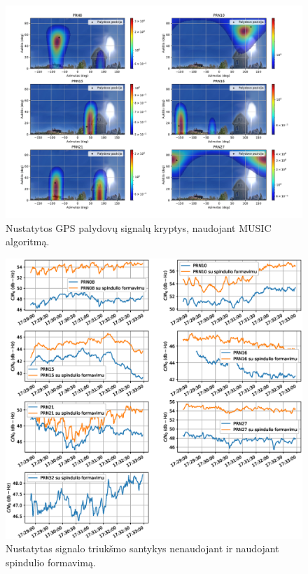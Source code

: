\documentclass[main.tex]{subfiles}
\begin{document}
\begin{figure}[ht]
    \begin{centering}
    \includegraphics[scale=0.45]{drawings/one_reflection_2}
    \par\end{centering}
    \protect\caption{\label{fig:single_reflection}Nustatytos GPS palydovų signalų kryptys, naudojant MUSIC algoritmą.}
\end{figure}

\begin{figure}[ht]
    \begin{centering}
    \includegraphics[scale=0.6]{drawings/one_reflection_snr}
    \par\end{centering}
    \protect\caption{\label{fig:single_reflection_snr}Nustatytas signalo triukšmo santykys nenaudojant ir naudojant spindulio formavimą.}
\end{figure}
\end{document}

